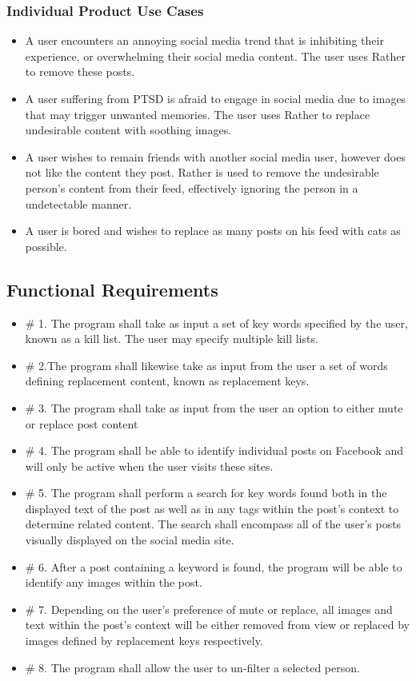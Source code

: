 \documentclass[12pt, titlepage]{article}
\begin{document}
\subsubsection{Individual Product Use Cases}
\begin{itemize}
  \item A user encounters an annoying social media trend that is inhibiting their experience, or overwhelming their social media content. The user uses Rather to remove these posts.
  \item A user suffering from PTSD is afraid to engage in social media due to images that may trigger unwanted memories. The user uses Rather to replace undesirable content with soothing images.
  \item A user wishes to remain friends with another social media user, however does not like the content they post. Rather is used to remove the undesirable person's content from their feed, effectively ignoring the person in a %
   undetectable manner.
  \item A user is bored and wishes to replace as many posts on his feed with cats as possible.
  
\end{itemize}

\subsection{Functional Requirements}
\begin{itemize}
  \item \# 1. The program shall take as input a set of key words specified by the user, known as a kill list. The user may specify multiple kill lists.
  \item  \# 2.The program shall likewise take as input from the user a set of words defining replacement content, known as replacement keys.
  \item \# 3. The program shall take as input from the user an option to either mute or replace post content
  \item \# 4. The program shall be able to identify individual posts on Facebook and will only be active when the user visits these sites.
  \item \# 5. The program shall perform a search for key words found both in the displayed text of the post as well as in any tags within the post's context to determine related content. The search shall encompass all of the user's posts visually displayed on the social media site.
  \item \# 6. After a post containing a keyword is found, the program will be able to identify any images within the post.
  \item \# 7. Depending on the user's preference of mute or replace, all images and text within the post's context will be either removed from view or replaced by images defined by replacement keys respectively.
  \item \# 8. The program shall allow the user to un-filter a selected person.
\end{itemize}
\end{document}

